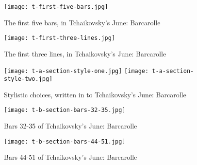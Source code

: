 \begin{figure}
  \centering
  \texttt{[image: t-first-five-bars.jpg]}
  \caption{The first five bars, in Tchaikovsky's June: Barcarolle}
  \label{fig:t-first-five-bars}
\end{figure}

\begin{figure}
  \centering
  \texttt{[image: t-first-three-lines.jpg]}
  \caption{The first three lines, in Tchaikovsky's June: Barcarolle}
  \label{fig:t-first-three-lines}
\end{figure}

\begin{figure}
  \centering
  \texttt{[image: t-a-section-style-one.jpg]}
  \texttt{[image: t-a-section-style-two.jpg]}
  \caption[Ornamentation Examples, in Tchaikovsky's June: Barcarolle]{Stylistic choices, written in to Tchaikovsky's June: Barcarolle}
  \label{fig:t-a-section-style-choices}
\end{figure}

\begin{figure}
  \centering
  \texttt{[image: t-b-section-bars-32-35.jpg]}
  \caption{Bars 32-35 of Tchaikovsky's June: Barcarolle}
  \label{fig:t-b-section-bars-32-35}
\end{figure}

\begin{figure}
  \centering
  \texttt{[image: t-b-section-bars-44-51.jpg]}
  \caption{Bars 44-51 of Tchaikovsky's June: Barcarolle}
  \label{fig:t-b-section-bars-44-51}
\end{figure}


